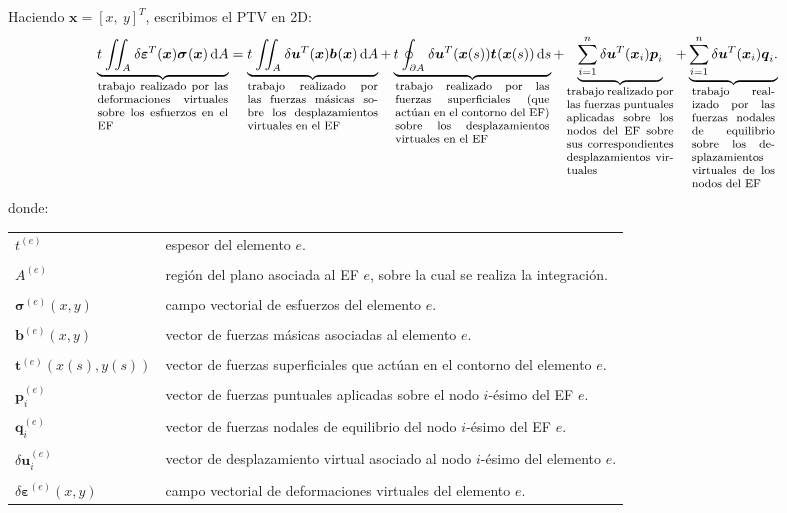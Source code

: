 \documentclass[12pt,letterpaper, landscape]{article}
\newcommand{\e}{{}}
\newcommand{\ve}[1]{{\boldsymbol{#1}}}
\newcommand{\dd}{\operatorname{d} \!}
\begin{document}
Haciendo $\ve{x} = [x,\ y]^T$, escribimos el PTV en 2D:
\begin{equation}
\underbrace{t^\e \iint_{A^\e} \delta\ve{\varepsilon}_\e^T(\ve{x}) \ve{\sigma}^\e(\ve{x}) \dd A}_{\footnotesize\parbox{11em}{trabajo realizado por las deformaciones virtuales sobre los esfuerzos en el EF}}
 = \underbrace{t^\e \iint_{A^\e} \delta \ve{u}_\e^T(\ve{x}) \ve{b}^\e(\ve{x}) \dd A}_{\footnotesize\parbox{11em}{trabajo realizado por las fuerzas másicas sobre los desplazamientos virtuales en el EF}}
+ \underbrace{t^\e \oint_{\partial A^\e} \delta \ve{u}_\e^T(\ve{x}(s)) \ve{t}^\e(\ve{x}(s)) \dd s}_{\footnotesize\parbox{13em}{trabajo realizado por las fuerzas superficiales (que actúan en el contorno del EF) sobre los desplazamientos virtuales en el EF}}
+ \underbrace{\sum_{i=1}^n \delta \ve{u}_\e^T(\ve{x}_i) \ve{p}_i^\e}_{\footnotesize\parbox{9em}{trabajo realizado por las fuerzas puntuales aplicadas sobre los nodos del EF sobre sus correspondientes desplazamientos virtuales}}
+ \underbrace{\sum_{i=1}^n \delta \ve{u}_\e^T(\ve{x}_i) \ve{q}_i^\e.}_{\footnotesize\parbox{7em}{trabajo realizado por las fuerzas nodales de equilibrio sobre los desplazamientos virtuales de los nodos del EF}} \label{eq:PTV}
\end{equation}
donde: 

\begin{tabular}{ll}
   $t^{(e)}$     & espesor del elemento $e$.\\
   \\[-1ex]   
   $A^{(e)}$     & región del plano asociada al EF $e$, sobre la cual se realiza la integración.\\
   \\[-1ex]
   $\ve{\sigma}^{(e)}(x,y)$     & campo vectorial de esfuerzos del elemento $e$.\\
   \\[-1ex]   
   $\ve{b}^{(e)}(x,y)$ & vector de fuerzas másicas asociadas al elemento $e$.\\
   \\[-1ex]
   $\ve{t}^{(e)}(x(s),y(s))$  & vector de fuerzas superficiales que actúan en el contorno del elemento $e$.\\
   \\[-1ex]
   $\ve{p}_i^{(e)}$       & vector de fuerzas puntuales aplicadas sobre el nodo $i$-ésimo del EF $e$.\\
   \\[-1ex]
   $\ve{q}_i^{(e)}$ & vector de fuerzas nodales de equilibrio del nodo $i$-ésimo del EF $e$.\\
   \\[-1ex]
   $\delta\ve{u}_i^{(e)}$ & vector de desplazamiento virtual asociado al nodo $i$-ésimo del elemento $e$.\\
   \\[-1ex]      
   $\delta\ve{\varepsilon}^{(e)}(x,y)$     & campo vectorial de deformaciones virtuales del elemento $e$.
\end{tabular} 
\end{document}
